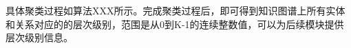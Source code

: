\documentclass[algorithmlist, AutoFakeBold, AutoFakeSlant, figurelist, tablelist, nomlist, masters]{seuthesix}
\begin{document}

具体聚类过程如算法XXX所示。完成聚类过程后，即可得到知识图谱上所有实体和关系对应的的层次级别，范围是从0到K-1的连续整数值，可以为后续模块提供层次级别信息。
\end{document}
